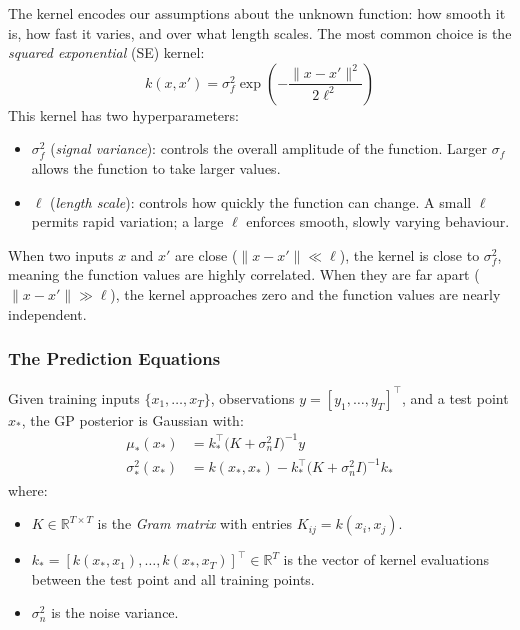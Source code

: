 The kernel encodes our assumptions about the unknown function: how smooth it is, how fast it varies, and over what length scales. The most common choice is the \emph{squared exponential} (SE) kernel:
\begin{equation}\label{eq:se_kernel}
	k(x, x') = \sigma_f^2 \exp\!\left(-\frac{\|x - x'\|^2}{2\ell^2}\right)
\end{equation}
This kernel has two hyperparameters:
\begin{itemize}[noitemsep]
	\item $\sigma_f^2$ (\emph{signal variance}): controls the overall amplitude of the function. Larger $\sigma_f$ allows the function to take larger values.
	\item $\ell$ (\emph{length scale}): controls how quickly the function can change. A small $\ell$ permits rapid variation; a large $\ell$ enforces smooth, slowly varying behaviour.
\end{itemize}
When two inputs $x$ and $x'$ are close ($\|x - x'\| \ll \ell$), the kernel is close to $\sigma_f^2$, meaning the function values are highly correlated. When they are far apart ($\|x - x'\| \gg \ell$), the kernel approaches zero and the function values are nearly independent.

\subsubsection*{The Prediction Equations}

Given training inputs $\{x_1, \ldots, x_T\}$, observations $y = [y_1, \ldots, y_T]^\top$, and a test point $x_*$, the GP posterior is Gaussian with:
\begin{align*}
	\mu_*(x_*) &= k_*^\top \bigl(K + \sigma_n^2 I\bigr)^{-1} y \\[4pt]
	\sigma_*^2(x_*) &= k(x_*, x_*) - k_*^\top \bigl(K + \sigma_n^2 I\bigr)^{-1} k_*
\end{align*}
where:
\begin{itemize}[noitemsep]
	\item $K \in \mathbb{R}^{T \times T}$ is the \emph{Gram matrix} with entries $K_{ij} = k(x_i, x_j)$.
	\item $k_* = [k(x_*, x_1), \ldots, k(x_*, x_T)]^\top \in \mathbb{R}^T$ is the vector of kernel evaluations between the test point and all training points.
	\item $\sigma_n^2$ is the noise variance.
\end{itemize}

